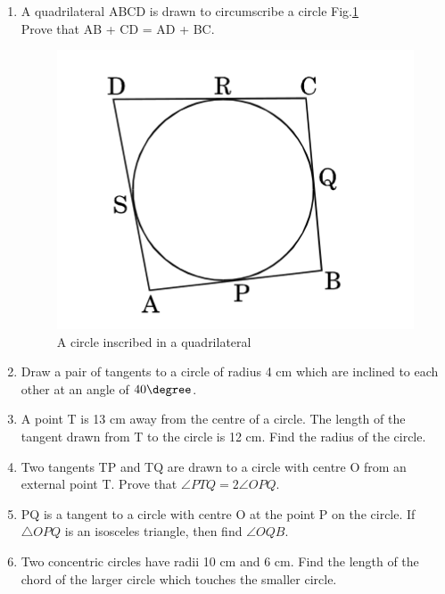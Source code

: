 \begin{enumerate}

        \item A quadrilateral ABCD is drawn to circumscribe a circle Fig.\ref{fig:leaf} \\ Prove that AB + CD = AD + BC.
    
        \begin{figure}[h]
        \centering
        \includegraphics[width=\columnwidth]{figs/2.jpg}
        \caption{A circle inscribed in a quadrilateral}
        \label{fig:leaf}
        \end{figure}
            
        \item Draw a pair of tangents to a circle of radius 4 cm which are inclined to each other at an angle of $40\degree$. 

        \item  A point T is 13 cm away from the centre of a circle. The length of the tangent drawn from T to the circle is 12 cm. Find the radius of the circle. 
    
        \item  Two tangents TP and TQ are drawn to a circle with centre O from an external point T. Prove that $\angle PTQ= 2 \angle OPQ$. 

        \item PQ is a tangent to a circle with centre O at the point P on the circle. If $\triangle OPQ$ is an isosceles triangle, then find $\angle OQB$. 

        \item Two concentric circles have radii 10 cm and 6 cm. Find the length of the chord of the larger circle which touches the smaller circle. 


\end{enumerate}
